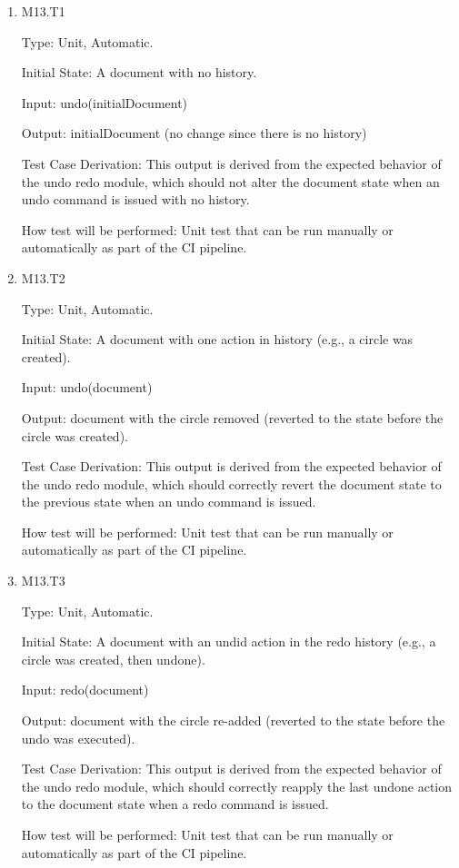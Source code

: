 \documentclass[12pt, titlepage]{article}
\begin{document}
\begin{enumerate}

\item{M13.T1\\}

Type: Unit, Automatic.

Initial State: A document with no history.

Input: undo(initialDocument)

Output: initialDocument (no change since there is no history)

Test Case Derivation:
This output is derived from the expected behavior of the undo redo module, which
    should not alter the document state when an undo command is issued with no history.

How test will be performed:
Unit test that can be run manually or automatically as part of the CI pipeline.

\item{M13.T2\\}

Type: Unit, Automatic.

Initial State: A document with one action in history (e.g., a circle was created).

Input: undo(document)

Output: document with the circle removed (reverted to the state before the circle was created).

Test Case Derivation:
This output is derived from the expected behavior of the undo redo module, which
    should correctly revert the document state to the previous state when an undo command is issued.

How test will be performed:
Unit test that can be run manually or automatically as part of the CI pipeline.

\item{M13.T3\\}

Type: Unit, Automatic.

Initial State: A document with an undid action in the redo history (e.g., a circle was created, then undone).

Input: redo(document)

Output: document with the circle re-added (reverted to the state before the undo was executed).

Test Case Derivation:
This output is derived from the expected behavior of the undo redo module, which
    should correctly reapply the last undone action to the document state when a redo command is issued.

How test will be performed:
Unit test that can be run manually or automatically as part of the CI pipeline.

\end{enumerate}
\end{document}

